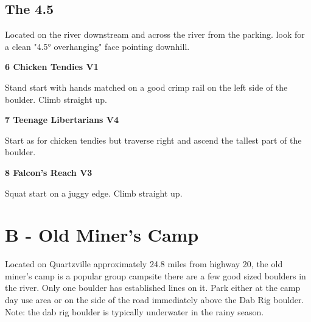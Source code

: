 	\begin{multicols}{2}


\needspace{1.5cm}
\subsection*{The 4.5}\label{bf:The 4.5}
Located on the river downstream and across the river from the parking. look for a clean "4.5° overhanging" face pointing downhill.\\
	


\needspace{1.5cm}
\label{rt:Chicken Tendies}
\colorbox{green!20}{
\parbox{0.95\linewidth}{
\textbf{
6 Chicken Tendies V1  
}}}

\begin{adjustwidth}{0.5cm}{}			
Stand start with hands matched on a good crimp rail on the left side of the boulder. Climb straight up.
\end{adjustwidth}



\needspace{1.5cm}
\label{rt:Teenage Libertarians}
\colorbox{RoyalBlue!20}{
\parbox{0.95\linewidth}{
\textbf{
7 Teenage Libertarians V4  
}}}

\begin{adjustwidth}{0.5cm}{}			
Start as for chicken tendies but traverse right and ascend the tallest part of the boulder.
\end{adjustwidth}



\needspace{1.5cm}
\label{rt:Falcon's Reach}
\colorbox{green!20}{
\parbox{0.95\linewidth}{
\textbf{
8 Falcon's Reach V3  
}}}

\begin{adjustwidth}{0.5cm}{}			
Squat start on a juggy edge. Climb straight up.
\end{adjustwidth}




\newpage

\section{B - Old Miner's Camp}\label{sa:Old Miner's Camp}
Located on Quartzville approximately 24.8 miles from highway 20, the old miner's camp is a popular group campsite there are a few good sized boulders in the river. Only one boulder has established lines on it. Park either at the camp day use area or on the side of the road immediately above the Dab Rig boulder. Note: the dab rig boulder is typically underwater in the rainy season.\\





\end{multicols}

